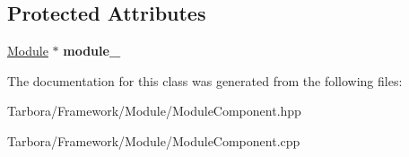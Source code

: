 \subsection*{Protected Attributes}
\begin{DoxyCompactItemize}
\item 
\mbox{\label{classTarbora_1_1ModuleComponent_a77fdd1e8ca1d2b9f72708a3aa127f0be}} 
\hyperlink{classTarbora_1_1Module}{Module} $\ast$ {\bfseries module\+\_\+}
\end{DoxyCompactItemize}


The documentation for this class was generated from the following files\+:\begin{DoxyCompactItemize}
\item 
Tarbora/\+Framework/\+Module/Module\+Component.\+hpp\item 
Tarbora/\+Framework/\+Module/Module\+Component.\+cpp\end{DoxyCompactItemize}
